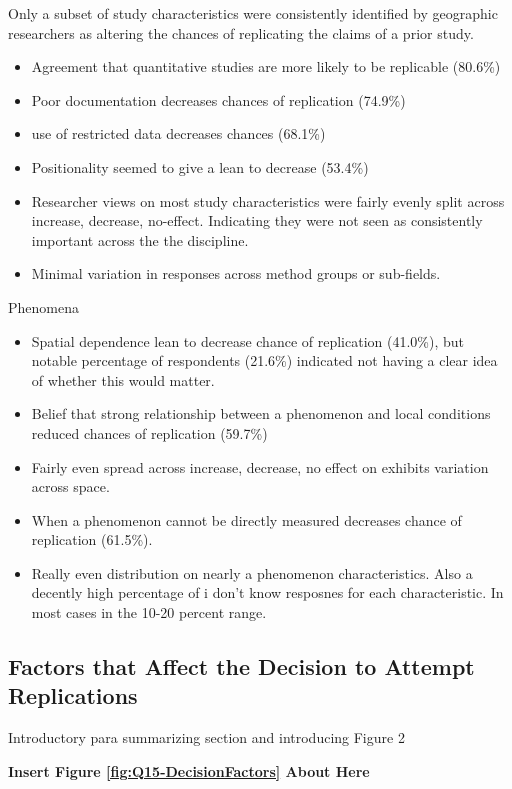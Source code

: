 \documentclass[]{interact}
\theoremstyle{plain}%
\theoremstyle{definition}
\theoremstyle{remark}
\begin{document}
Only a subset of study characteristics were consistently identified by geographic researchers as altering the chances of replicating the claims of a prior study.
\begin{itemize}
    \item Agreement that quantitative studies are more likely to be replicable (80.6\%)
    \item Poor documentation decreases chances of replication (74.9\%)
    \item use of restricted data decreases chances (68.1\%)
    \item Positionality seemed to give a lean to decrease (53.4\%)
    \item Researcher views on most study characteristics were fairly evenly split across increase, decrease, no-effect. Indicating they were not seen as consistently important across the the discipline. 
    \item Minimal variation in responses across method groups or sub-fields. 
\end{itemize}

Phenomena
\begin{itemize}
    \item Spatial dependence lean to decrease chance of replication (41.0\%), but notable percentage of respondents (21.6\%) indicated not having a clear idea of whether this would matter.
    \item Belief that strong relationship between a phenomenon and local conditions reduced chances of replication (59.7\%)
    \item Fairly even spread across increase, decrease, no effect on exhibits variation across space.
    \item When a phenomenon cannot be directly measured decreases chance of replication (61.5\%).
    \item Really even distribution on nearly a phenomenon characteristics. Also a decently high percentage of i don't know resposnes for each characteristic. In most cases in the 10-20 percent range. 
\end{itemize}

\subsection*{Factors that Affect the Decision to Attempt Replications}
Introductory para summarizing section and introducing Figure 2

\begin{center}
\textbf{Insert Figure \ref{fig:Q15-DecisionFactors} About Here}
\end{center}
\end{document}
